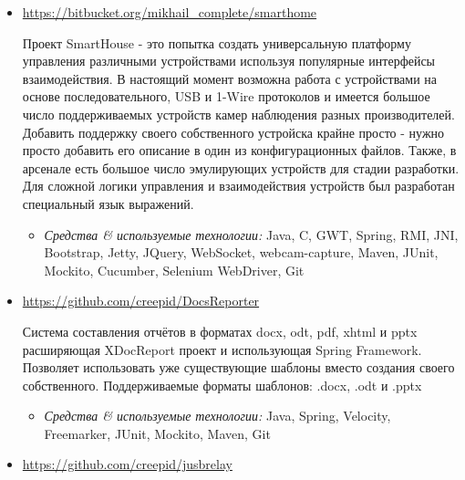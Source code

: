 \documentclass[a4paper, 12pt]{article}
\newcommand{\itemlabel}[1]{
    \textit{#1:}}
\begin{document}
  
    \begin{itemize}
   
        \item \href{https://bitbucket.org/mikhail_complete/smarthome/src}{https://bitbucket.org/mikhail\_complete/smarthome}

            Проект SmartHouse - это попытка создать универсальную платформу управления различными устройствами используя популярные интерфейсы взаимодействия. В настоящий момент возможна работа с устройствами на основе последовательного, USB и 1-Wire протоколов и имеется большое число поддерживаемых устройств камер наблюдения разных производителей. Добавить поддержку своего собственного устройска крайне просто - нужно просто добавить его описание в один из конфигурационных файлов. Также, в арсенале есть большое число эмулирующих устройств для стадии разработки.\newline
            Для сложной логики управления и взаимодействия устройств был разработан специальный язык выражений. 
                        
            \begin{itemize}
                \item \itemlabel{Средства \& используемые технологии} Java, C, GWT,  Spring, RMI, JNI, Bootstrap, Jetty, JQuery, WebSocket, webcam-capture, Maven, JUnit, Mockito, Cucumber, Selenium WebDriver, Git
            \end{itemize}
            

        \item \href{https://github.com/creepid/DocsReporter}{https://github.com/creepid/DocsReporter}

            Система составления отчётов в форматах docx, odt, pdf, xhtml и pptx расширяющая XDocReport проект и использующая Spring Framework. Позволяет использовать уже существующие шаблоны вместо создания своего собственного. \newline Поддерживаемые форматы шаблонов: .docx, .odt и .pptx

            \begin{itemize}
                \item \itemlabel{Средства \& используемые технологии} Java, Spring, Velocity, Freemarker, JUnit, Mockito, Maven, Git
            \end{itemize}
            
              \item \href{https://github.com/creepid/jusbrelay}{https://github.com/creepid/jusbrelay}


\end{itemize}
\end{document}
